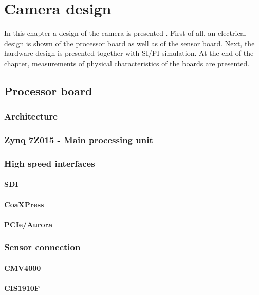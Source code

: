 \chapter{Camera design}

In this chapter a design of the camera is presented . First of all, an electrical design is shown of the processor board as well as of the sensor board. Next, the hardware design is presented together with SI/PI simulation.
At the end of the chapter, measurements of physical characteristics of the boards are presented.

\section{Processor board} 

\subsection{Architecture}

\subsection{Zynq 7Z015 - Main processing unit}

\subsection{High speed interfaces}
\subsubsection{SDI}
\subsubsection{CoaXPress}
\subsubsection{PCIe/Aurora}

\subsection{Sensor connection}
\subsubsection{CMV4000}
\subsubsection{CIS1910F}

